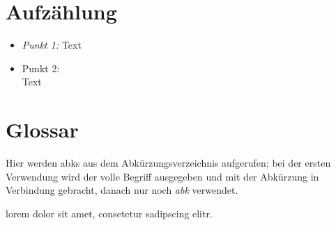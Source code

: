 \section{Aufzählung}

\begin{itemize}
  \item\textit{Punkt 1:} Text
  \item Punkt 2: \\ Text
\end{itemize}

\section{Glossar}
Hier werden \glspl{abk} aus dem Abkürzungsverzeichnis aufgerufen; bei der ersten Verwendung wird der volle Begriff ausgegeben und mit der Abkürzung in Verbindung gebracht, danach nur noch \emph{\gls{abk}} verwendet.

\gls{lorem} dolor sit amet, consetetur sadipscing elitr.
